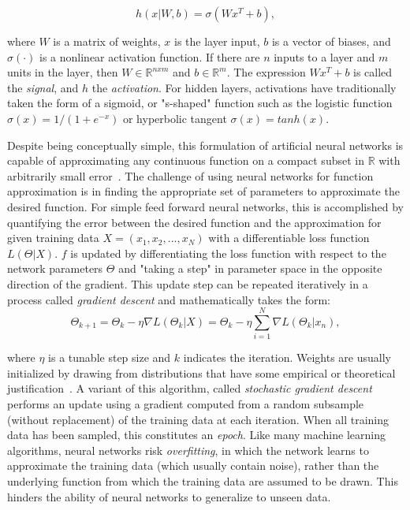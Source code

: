 \begin{equation}
h(x|W, b)=\sigma(W x^T + b),
\label{eq:denselayer}
\end{equation}

\noindent
where $W$ is a matrix of weights, $x$ is the layer input, $b$ is a vector of biases, and $\sigma(\cdot)$ is a nonlinear activation function.
If there are $n$ inputs to a layer and $m$ units in the layer, then $W\in\mathbb{R}^{nxm}$ and $b\in\mathbb{R}^{m}$.
The expression $W x^T + b$ is called the \textit{signal}, and $h$ the \textit{activation}.
For hidden layers, activations have traditionally taken the form of a sigmoid, or "s-shaped" function such as the logistic function $\sigma(x) = 1/(1+e^{-x})$ or hyperbolic tangent $\sigma(x) = tanh(x)$.

Despite being conceptually simple, this formulation of artificial neural networks is capable of approximating any continuous function on a compact subset in $\mathbb{R}$ with arbitrarily small error~\cite{cybenko1989}.
The challenge of using neural networks for function approximation is in finding the appropriate set of parameters to approximate the desired function.
For simple feed forward neural networks, this is accomplished by quantifying the error between the desired function and the approximation for given training data $X=(x_1, x_2, ..., x_N)$ with a differentiable loss function $L(\Theta | X)$. 
$f$ is updated by differentiating the loss function with respect to the network parameters $\Theta$ and "taking a step" in parameter space in the opposite direction of the gradient. 
This update step can be repeated iteratively in a process called \textit{gradient descent} and mathematically takes the form:
\begin{equation}
\Theta_{k+1} = \Theta_k - \eta \nabla L(\Theta_k | X) = \Theta_k - \eta \sum_{i=1}^{N} \nabla L(\Theta_k | x_n),
\label{eq:batch_gd}
\end{equation}

\noindent
where $\eta$ is a tunable step size and $k$ indicates the iteration.
Weights are usually initialized by drawing from distributions that have some empirical or theoretical justification~\cite{glorot2010}.
A variant of this algorithm, called \textit{stochastic gradient descent} performs an update using a gradient computed from a random subsample (without replacement) of the training data at each iteration.
When all training data has been sampled, this constitutes an \textit{epoch}.
Like many machine learning algorithms, neural networks risk \textit{overfitting}, in which the network learns to approximate the training data (which usually contain noise), rather than the underlying function from which the training data are assumed to be drawn.
This hinders the ability of neural networks to generalize to unseen data.

